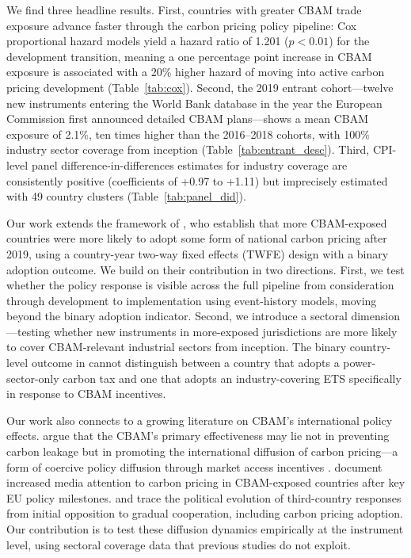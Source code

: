 \documentclass[12pt,a4paper]{article}
\begin{document}
We find three headline results. First, countries with greater CBAM trade exposure advance faster through the carbon pricing policy pipeline: Cox proportional hazard models yield a hazard ratio of 1.201 ($p<0.01$) for the development transition, meaning a one percentage point increase in CBAM exposure is associated with a 20\% higher hazard of moving into active carbon pricing development (Table~\ref{tab:cox}). Second, the 2019 entrant cohort---twelve new instruments entering the World Bank database in the year the European Commission first announced detailed CBAM plans---shows a mean CBAM exposure of 2.1\%, ten times higher than the 2016--2018 cohorts, with 100\% industry sector coverage from inception (Table~\ref{tab:entrant_desc}). Third, CPI-level panel difference-in-differences estimates for industry coverage are consistently positive (coefficients of +0.97 to +1.11) but imprecisely estimated with 49 country clusters (Table~\ref{tab:panel_did}).

Our work extends the framework of \citet{Bahi2026}, who establish that more CBAM-exposed countries were more likely to adopt some form of national carbon pricing after 2019, using a country-year two-way fixed effects (TWFE) design with a binary adoption outcome. We build on their contribution in two directions. First, we test whether the policy response is visible across the full pipeline from consideration through development to implementation using event-history models, moving beyond the binary adoption indicator. Second, we introduce a sectoral dimension---testing whether new instruments in more-exposed jurisdictions are more likely to cover CBAM-relevant industrial sectors from inception. The binary country-level outcome in \citet{Bahi2026} cannot distinguish between a country that adopts a power-sector-only carbon tax and one that adopts an industry-covering ETS specifically in response to CBAM incentives.

Our work also connects to a growing literature on CBAM's international policy effects. \citet{Mehling2025} argue that the CBAM's primary effectiveness may lie not in preventing carbon leakage but in promoting the international diffusion of carbon pricing---a form of coercive policy diffusion through market access incentives \citep{Simmons2006}. \citet{Clausing2024} document increased media attention to carbon pricing in CBAM-exposed countries after key EU policy milestones. \citet{Smith2024} and \citet{Otto2025} trace the political evolution of third-country responses from initial opposition to gradual cooperation, including carbon pricing adoption. Our contribution is to test these diffusion dynamics empirically at the instrument level, using sectoral coverage data that previous studies do not exploit.
\end{document}

